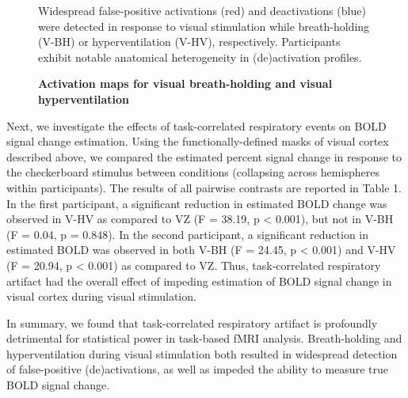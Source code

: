 \documentclass[9pt]{NEU502b-fmri}
\begin{document}
\begin{figure}
\centerline{%
%
}
\caption{\textbf{Activation maps for visual breath-holding and visual hyperventilation}}
\par Widespread false-positive activations (red) and deactivations (blue) were detected in response to visual stimulation while breath-holding (V-BH) or hyperventilation (V-HV), respectively. Participants exhibit notable anatomical heterogeneity in (de)activation profiles.

\end{figure}

Next, we investigate the effects of task-correlated respiratory events on BOLD signal change estimation. Using the functionally-defined masks of visual cortex described above, we compared the estimated percent signal change in response to the checkerboard stimulus between conditions (collapsing across hemispheres within participants). The results of all pairwise contrasts are reported in Table 1.  In the first participant, a significant reduction in estimated BOLD change was observed in V-HV  as compared to VZ (F = 38.19, p < 0.001), but not in V-BH (F = 0.04, p = 0.848). In the second participant, a significant reduction in estimated BOLD was observed in both V-BH (F = 24.45, p < 0.001)  and V-HV (F = 20.94, p < 0.001) as compared to VZ. Thus, task-correlated respiratory artifact had the overall effect of impeding estimation of BOLD signal change in visual cortex during visual stimulation. 

In summary, we found that task-correlated respiratory artifact is profoundly detrimental for statistical power in task-based fMRI analysis. Breath-holding and hyperventilation during visual stimulation both resulted in widespread detection of false-positive (de)activations, as well as impeded the ability to measure true BOLD signal change. 
\end{document}
